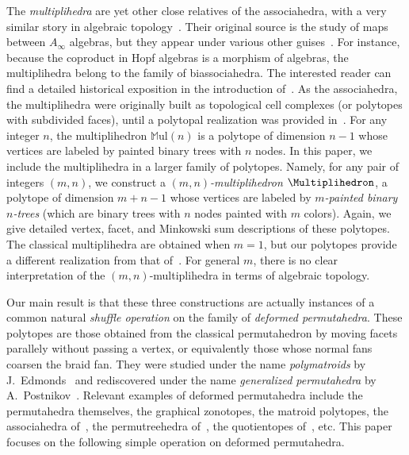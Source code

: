 \documentclass[AHL,Unicode,longabstracts,published]{cedram}
\newcommand{\rul}{\mathrm{ul}}
\newcommand{\polytope}[1]{\mathds{#1}}
\begin{document}
The
\emph{multiplihedra} are yet other close relatives of the associahedra, with a very similar story in algebraic topology~\cite{Stasheff-HSpaces}. Their original source is the study of maps between $A_\infty$ algebras, but they appear under various other guises~\cite{ForceyLauveSottile, MauWoodward,SaneblidzeUmble-diagonals}. For instance, because the coproduct in Hopf algebras is a morphism of algebras, the multiplihedra belong to the family of biassociahedra. The interested reader can find a detailed historical exposition in the introduction of~\cite{Forcey-multiplihedra}. As the associahedra, the multiplihedra were originally built as topological cell complexes (or polytopes with subdivided faces), until a polytopal realization was provided in~\cite{ArdilaDoker,Forcey-multiplihedra}. For any integer $n$, the multiplihedron $\polytope{M}\rul(n)$ is a polytope of dimension $n-1$ whose vertices are labeled by painted binary trees with $n$ nodes. In this paper, we include the multiplihedra in a larger family of polytopes. Namely, for any pair of integers $(m,n)$, we construct a
\emph{$(m,n)$-multiplihedron} $\Multiplihedron$, a polytope of dimension $m+n-1$ whose vertices are labeled by
\emph{$m$-painted binary $n$-trees} (which are binary trees with $n$ nodes painted with $m$ colors). Again, we give detailed vertex, facet, and Minkowski sum descriptions of these polytopes. The classical multiplihedra are obtained when $m = 1$, but our polytopes provide a different realization from that of~\cite{ArdilaDoker,Forcey-multiplihedra}. For general $m$, there is no clear interpretation of the $(m,n)$-multiplihedra in terms of algebraic topology.

Our main result is that these three constructions are actually instances of a common natural
\emph{shuffle operation} on the family of
\emph{deformed permutahedra}. These polytopes are those obtained from the classical permutahedron by moving facets parallely without passing a vertex, or equivalently those whose normal fans coarsen the braid fan. They were studied under the name
\emph{polymatroids} by J.~Edmonds~\cite{Edmonds} and rediscovered under the name
\emph{generalized permutahedra} by A.~Postnikov~\cite{Postnikov}. Relevant examples of deformed permutahedra include the permutahedra themselves, the graphical zonotopes, the matroid polytopes, the associahedra of~\cite{HohlwegLange,Loday,ShniderSternberg}, the permutreehedra of~\cite{PilaudPons-permutrees}, the quotientopes of~\cite{PadrolPilaudRitter,PilaudSantos-quotientopes}, etc. This paper focuses on the following simple operation on deformed permutahedra.
\end{document}
